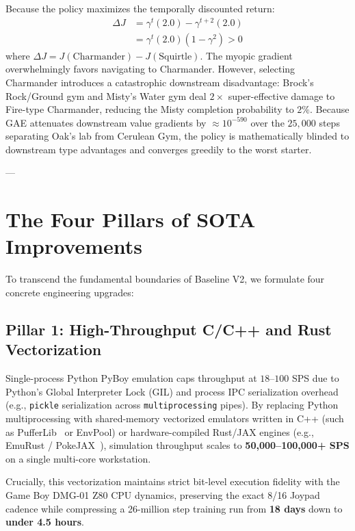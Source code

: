 \documentclass[conference]{IEEEtran}
\begin{document}
Because the policy maximizes the temporally discounted return:
\begin{align}
\Delta J &= \gamma^t (2.0) - \gamma^{t+2} (2.0) \nonumber \\
&= \gamma^t (2.0)(1 - \gamma^2) > 0
\end{align}
where $\Delta J = J(\text{Charmander}) - J(\text{Squirtle})$. The myopic gradient overwhelmingly favors navigating to Charmander. However, selecting Charmander introduces a catastrophic downstream disadvantage: Brock's Rock/Ground gym and Misty's Water gym deal $2\times$ super-effective damage to Fire-type Charmander, reducing the Misty completion probability to $2\%$. Because GAE attenuates downstream value gradients by $\approx 10^{-590}$ over the $25{,}000$ steps separating Oak's lab from Cerulean Gym, the policy is mathematically blinded to downstream type advantages and converges greedily to the worst starter.

---

\section{The Four Pillars of SOTA Improvements}

To transcend the fundamental boundaries of Baseline V2, we formulate four concrete engineering upgrades:

\subsection{Pillar 1: High-Throughput C/C++ and Rust Vectorization}
Single-process Python PyBoy emulation caps throughput at $18$--$100$ SPS due to Python's Global Interpreter Lock (GIL) and process IPC serialization overhead (e.g., \texttt{pickle} serialization across \texttt{multiprocessing} pipes). By replacing Python multiprocessing with shared-memory vectorized emulators written in C++ (such as PufferLib~\cite{suarez2023pufferlib} or EnvPool) or hardware-compiled Rust/JAX engines (e.g., EmuRust / PokeJAX~\cite{karten2026automatic}), simulation throughput scales to \textbf{50,000--100,000+ SPS} on a single multi-core workstation.

Crucially, this vectorization maintains strict bit-level execution fidelity with the Game Boy DMG-01 Z80 CPU dynamics, preserving the exact 8/16 Joypad cadence while compressing a 26-million step training run from \textbf{18 days} down to \textbf{under 4.5 hours}.
\end{document}
